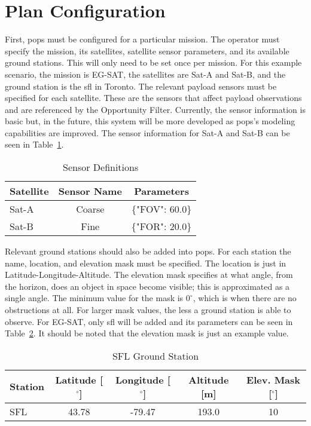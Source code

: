 \section{Plan Configuration}

First, \gls{pops} must be configured for a particular mission. The operator
must specify the mission, its satellites, satellite sensor parameters, and its
available ground stations. This will only need to be set once per mission. For
this example scenario, the mission is EG-SAT, the satellites are Sat-A and
Sat-B, and the ground station is the \gls{sfl} in Toronto. The relevant payload
sensors must be specified for each satellite. These are the sensors that affect
payload observations and are referenced by the Opportunity Filter. Currently,
the sensor information is basic but, in the future, this system will be more
developed as \gls{pops}'s modeling capabilities are improved. The sensor
information for Sat-A and Sat-B can be seen in Table~\ref{tab:sensors}. 

\begin{table}[h] 
    \centering
    \caption{Sensor Definitions}
    \begin{tabular}{ccc}
	Satellite                  & Sensor Name & Parameters    \\ \hline
	\multicolumn{1}{l|}{Sat-A} & Coarse      & \{"FOV": 60.0\} \\
	\multicolumn{1}{l|}{Sat-B} & Fine        & \{"FOR": 20.0\}
    \end{tabular}
    \label{tab:sensors}
\end{table}

Relevant ground stations should also be added into \gls{pops}. For each station
the name, location, and elevation mask must be specified. The location is just
in Latitude-Longitude-Altitude. The elevation mask specifies at what angle,
from the horizon, does an object in space become visible; this is approximated
as a single angle. The minimum value for the mask is $0^\circ$, which is when
there are no obstructions at all. For larger mask values, the less a ground
station is able to observe. For EG-SAT, only \gls{sfl} will be added and its
parameters can be seen in Table~\ref{tab:ground-stations}. It should be noted
that the elevation mask is just an example value.

\begin{table}[h] 
    \centering
    \caption{SFL Ground Station}
    \begin{tabular}{ccccc}
	Station                  & Latitude [$^\circ$] & Longitude [$^\circ$] & Altitude [m] & Elev. Mask [$^\circ$] \\ \hline
	\multicolumn{1}{l|}{SFL} & 43.78   & -79.47   & 193.0  & 10      \\
    \end{tabular}
    \label{tab:ground-stations}
\end{table}


